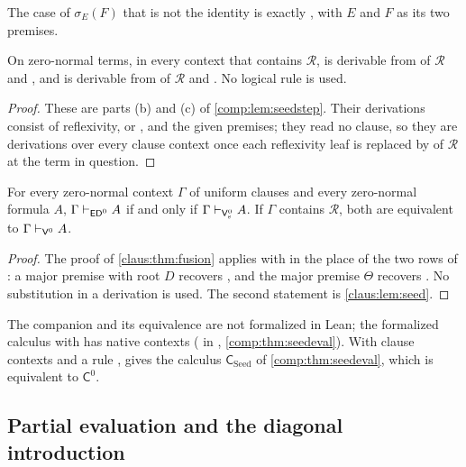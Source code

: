 The case of $\sigma_E(F)$ that is not the identity is exactly
, with $E$ and $F$ as its two premises.

\begin{lemma}
\label{claus:lem:seed}
On zero-normal terms, in every context that contains $\mathcal{R}$,
 is derivable from  of $\mathcal{R}$ and
, and  is derivable from  of
$\mathcal{R}$ and . No logical rule is used.
\end{lemma}
\begin{proof}
These are parts (b) and (c) of \cref{comp:lem:seedstep}. Their derivations
consist of reflexivity,  or , and the
given premises; they read no clause, so they are derivations over every
clause context once each reflexivity leaf is replaced by  of
$\mathcal{R}$ at the term in question.
\end{proof}

\begin{theorem}
\label{claus:thm:fusionzero}
For every zero-normal context $\Gamma$ of uniform clauses and every
zero-normal formula $A$,
$\Gamma\vdash_{\mathsf{ED}^{0}}A$ if and only if
$\Gamma\vdash_{\mathsf{V}^{0}_{\mathrm{s}}}A$. If $\Gamma$ contains
$\mathcal{R}$, both are equivalent to $\Gamma\vdash_{\mathsf{V}^{0}}A$.
\end{theorem}
\begin{proof}
The proof of \cref{claus:thm:fusion} applies with  in
the place of the two rows of : a major premise with root
$D$ recovers , and the major premise $\Theta$ recovers
. No substitution in a derivation is used. The second
statement is \cref{claus:lem:seed}.
\end{proof}

The companion and its equivalence are not formalized in Lean; the
formalized calculus with  has native contexts
( in , \cref{comp:thm:seedeval}). With clause contexts and a rule
,  gives the calculus
$\mathsf{C}_{\mathrm{Seed}}$ of \cref{comp:thm:seedeval}, which is
equivalent to $\mathsf{C}^{0}$.

\subsection{Partial evaluation and the diagonal introduction}
\label{claus:sec:pd}

